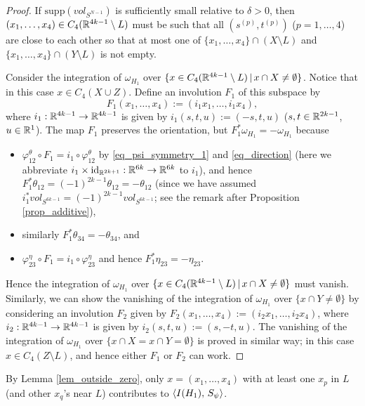 \begin{proof}
If $\text{supp}(vol_{S^{N-1}})$ is sufficiently small relative to $\delta >0$, then
$(x_1 ,\dots ,x_4 ) \in C_4 (\mathbb{R}^{4k-1}\setminus L)$ must be such that all $(s^{(p)},t^{(p)})$ ($p=1,\dots ,4$) are
close to each other so that at most one of
$\{ x_1 ,\dots ,x_4 \} \cap (X\setminus L)$ and $\{ x_1 ,\dots ,x_4 \} \cap (Y\setminus L)$ is not empty.


Consider the integration of $\omega_{H_1}$ over $\{ x \in C_4 (\mathbb{R}^{4k-1}\setminus L)\, |\, x \cap X \ne \emptyset \}$.
Notice that in this case $x\in C_4 (X \cup Z)$.
Define an involution $F_1$ of this subspace by
\[
 F_1 (x_1 ,\dots ,x_4 ):=(i_1 x_1 ,\dots ,i_1 x_4 ),
\]
where $i_1 :\mathbb{R}^{4k-1} \to \mathbb{R}^{4k-1}$ is given by $i_1 (s,t,u):=(-s,t,u)$ ($s,t \in \mathbb{R}^{2k-1}$, $u\in \mathbb{R}^1$).
The map $F_1$ preserves the orientation, but $F^*_1 \omega_{H_1}=-\omega_{H_1}$ because
\begin{itemize}
\item
 $\varphi^{\theta}_{12}\circ F_1 =i_1 \circ \varphi^{\theta}_{12}$ by \eqref{eq_psi_symmetry_1} and \eqref{eq_direction}
 (here we abbreviate $i_1 \times \mathrm{id}_{\mathbb{R}^{2k+1}} :\mathbb{R}^{6k}\to \mathbb{R}^{6k}$ to $i_1$), and hence
 $F^*_1 \theta_{12}=(-1)^{2k-1}\theta_{12}=-\theta_{12}$ (since we have assumed
 $i^*_1 vol_{S^{6k-1}}=(-1)^{2k-1}vol_{S^{6k-1}}$; see the remark after Proposition \ref{prop_additive}),
\item
 similarly $F^*_1 \theta_{34}=-\theta_{34}$, and
\item
 $\varphi^{\eta}_{23}\circ F_1 =i_1 \circ \varphi^{\eta}_{23}$ and hence $F^*_1 \eta_{23}=-\eta_{23}$.
\end{itemize}
Hence the integration of $\omega_{H_1}$ over $\{ x \in C_4 (\mathbb{R}^{4k-1}\setminus L)\, |\, x \cap X \ne \emptyset \}$ must
vanish.
Similarly, we can show the vanishing of the integration of $\omega_{H_1}$ over $\{ x\cap Y\ne \emptyset \}$ by considering
an involution $F_2$ given by $F_2 (x_1 ,\dots ,x_4 ):=(i_2 x_1 ,\dots ,i_2 x_4)$, where $i_2 :\mathbb{R}^{4k-1} \to \mathbb{R}^{4k-1}$
is given by $i_2 (s,t,u):=(s,-t,u)$.
The vanishing of the integration of $\omega_{H_1}$ over $\{ x \cap X = x\cap Y = \emptyset \}$ is proved in similar way;
in this case $x \in C_4 (Z\setminus L)$, and hence either $F_1$ or $F_2$ can work.
\end{proof}


By Lemma \ref{lem_outside_zero}, only $x=(x_1 ,\dots ,x_4 )$ with at least one $x_p$ in $L$ (and other $x_q$'s near $L$)
contributes to $\langle {I(H_1 )},\, {S_{\psi}}\rangle$.


